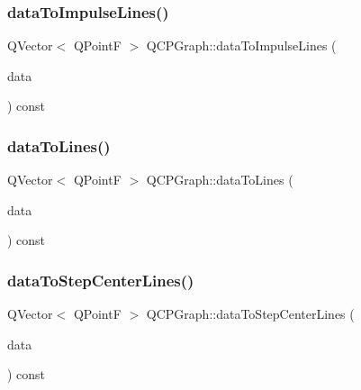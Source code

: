 \subsubsection{\texorpdfstring{dataToImpulseLines()}{dataToImpulseLines()}}
{\footnotesize\ttfamily Q\+Vector$<$ Q\+PointF $>$ Q\+C\+P\+Graph\+::data\+To\+Impulse\+Lines (\begin{DoxyParamCaption}\item[{const Q\+Vector$<$ \mbox{\hyperlink{class_q_c_p_graph_data}{Q\+C\+P\+Graph\+Data}} $>$ \&}]{data }\end{DoxyParamCaption}) const\hspace{0.3cm}{\ttfamily [protected]}}

\mbox{\label{class_q_c_p_graph_a0085ee728fdd72a827c1e6ced4476363}} 
\subsubsection{\texorpdfstring{dataToLines()}{dataToLines()}}
{\footnotesize\ttfamily Q\+Vector$<$ Q\+PointF $>$ Q\+C\+P\+Graph\+::data\+To\+Lines (\begin{DoxyParamCaption}\item[{const Q\+Vector$<$ \mbox{\hyperlink{class_q_c_p_graph_data}{Q\+C\+P\+Graph\+Data}} $>$ \&}]{data }\end{DoxyParamCaption}) const\hspace{0.3cm}{\ttfamily [protected]}}

\mbox{\label{class_q_c_p_graph_a238116f1898c49cb8209d61707b5b367}} 
\subsubsection{\texorpdfstring{dataToStepCenterLines()}{dataToStepCenterLines()}}
{\footnotesize\ttfamily Q\+Vector$<$ Q\+PointF $>$ Q\+C\+P\+Graph\+::data\+To\+Step\+Center\+Lines (\begin{DoxyParamCaption}\item[{const Q\+Vector$<$ \mbox{\hyperlink{class_q_c_p_graph_data}{Q\+C\+P\+Graph\+Data}} $>$ \&}]{data }\end{DoxyParamCaption}) const\hspace{0.3cm}{\ttfamily [protected]}}

